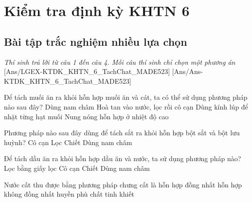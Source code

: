 \documentclass[FileMain.tex]{subfiles}
\begin{document}
\section[Kiểm tra định kỳ KHTN 6 - Tách chất ra khỏi hỗn hợp]{Kiểm tra định kỳ KHTN 6 }

\subsection{Bài tập trắc nghiệm nhiều lựa chọn}\textit{\large Thí sinh trả lời từ câu 1 đến câu 4. Mỗi câu thí sinh chỉ chọn một phương án}
[Ans/LGEX-KTDK_KHTN_6_TachChat_MADE523]
[Ans/Ans-KTDK_KHTN_6_TachChat_MADE523]

\begin{ex}%
	Để tách muối ăn ra khỏi hỗn hợp muối ăn và cát, ta có thể sử dụng phương pháp nào sau đây?
	\choice
	{Dùng nam châm}
	{\True Hoà tan vào nước, lọc rồi cô cạn}
	{Dùng kính lúp để nhặt từng hạt muối}
	{Nung nóng hỗn hợp ở nhiệt độ cao}
\end{ex}

\begin{ex}%
	Phương pháp nào sau đây dùng để tách sắt ra khỏi hỗn hợp bột sắt và bột lưu huỳnh?
	\choice
	{Cô cạn}
	{Lọc}
	{Chiết}
	{\True Dùng nam châm}
\end{ex}

\begin{ex}%
	Để tách dầu ăn ra khỏi hỗn hợp dầu ăn và nước, ta sử dụng phương pháp nào?
	\choice
	{Lọc bằng giấy lọc}
	{Cô cạn}
	{\True Chiết}
	{Dùng nam châm}
\end{ex}

\begin{ex}%
	Nước cất thu được bằng phương pháp chưng cất là
	\choice
	{hỗn hợp đồng nhất}
	{hỗn hợp không đồng nhất}
	{huyền phù}
	{\True chất tinh khiết}
\end{ex}
\end{document}
